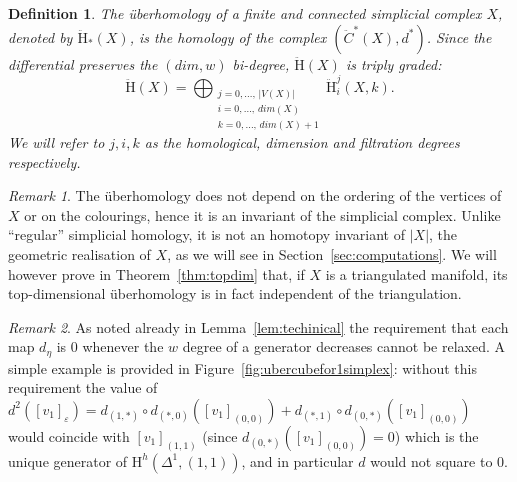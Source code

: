 \documentclass[11pt, a4paper, reqno, twoside, makeidx]{amsart}
\theoremstyle{remark}
\newtheorem{rmk}{Remark}[section]
\theoremstyle{plain}
\newtheorem{defi}[thm]{Definition}
\theoremstyle{definition}
\newcommand{\HH}{\mathrm{H}}
\newcommand{\uH}{\ddot{\mathrm{H}}}
\begin{document}
\begin{defi}\label{def:uberh}
The \emph{\"{u}berhomology} of a finite and connected simplicial complex $X$, denoted by $\uH_*(X)$, is the homology of the complex $\left( \ddot{C}^*(X), d^*\right)$. Since the differential preserves the $(dim, w)$ bi-degree, $\uH(X)$ is triply graded:
$$\uH(X) = \bigoplus_{\substack{j = 0,\ldots,\,|V(X)|\\i = 0,\ldots,\,dim(X) \\ k = 0, \ldots,\,dim(X)+1}} \uH_i^j(X,k).$$
We will refer to $j,i,k$ as the homological, dimension and filtration degrees respectively.
\end{defi}

\begin{rmk}
The \"uberhomology does not depend on the ordering of the vertices of $X$ or on the colourings, hence it is an invariant of the simplicial complex. Unlike ``regular'' simplicial homology, it is not an homotopy invariant of $|X|$, the geometric realisation of $X$, as we will see in Section~\ref{sec:computations}. We will however prove in Theorem~\ref{thm:topdim} that, if $X$ is a triangulated manifold, its top-dimensional \"uberhomology is in fact independent of the triangulation.
\end{rmk}


\begin{rmk}
As noted already in Lemma~\ref{lem:techinical} the requirement that each map $d_\eta$ is $0$ whenever the $w$ degree of a generator decreases cannot be relaxed. A simple example is provided in Figure~\ref{fig:ubercubefor1simplex}: without this requirement the value of $d^2([v_1]_\varepsilon) = d_{(1,*)}\circ d_{(*,0)}([v_1]_{(0,0)}) + d_{(*,1)}\circ d_{(0,*)}([v_1]_{(0,0)})$ would coincide with $[v_1]_{(1,1)}$ (since $d_{(0,*)}([v_1]_{(0,0)}) = 0$) which is the unique generator of $\HH^h(\Delta^1, (1,1))$, and in particular $d$ would not square to $0$.
\end{rmk}
\end{document}
